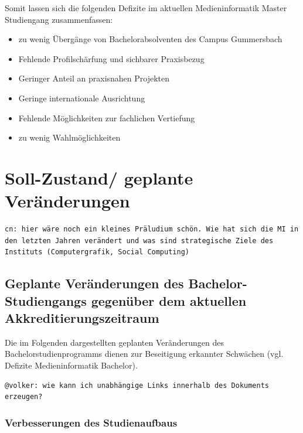 Somit lassen sich die folgenden Defizite im aktuellen Medieninformatik
Master Studiengang zusammenfassen:

\begin{itemize}
\tightlist
\item
  zu wenig Übergänge von Bachelorabsolventen des Campus Gummersbach
\item
  Fehlende Profilschärfung und sichbarer Praxisbezug
\item
  Geringer Anteil an praxisnahen Projekten
\item
  Geringe internationale Ausrichtung
\item
  Fehlende Möglichkeiten zur fachlichen Vertiefung
\item
  zu wenig Wahlmöglichkeiten
\end{itemize}

\chapter{Soll-Zustand/ geplante
Veränderungen}\label{soll-zustand-geplante-veruxe4nderungen}

\begin{verbatim}
cn: hier wäre noch ein kleines Präludium schön. Wie hat sich die MI in den letzten Jahren verändert und was sind strategische Ziele des Instituts (Computergrafik, Social Computing)
\end{verbatim}

\section{Geplante Veränderungen des Bachelor-Studiengangs gegenüber
dem aktuellen
Akkreditierungszeitraum}\label{geplante-veruxe4nderungen-des-bachelor-studiengangs-gegenuxfcber-dem-aktuellen-akkreditierungszeitraum}

Die im Folgenden dargestellten geplanten Veränderungen des
Bachelorstudienprogramms dienen zur Beseitigung erkannter Schwächen
(vgl. Defizite Medieninformatik Bachelor).

\begin{verbatim}
@volker: wie kann ich unabhängige Links innerhalb des Dokuments erzeugen?
\end{verbatim}

\subsection{Verbesserungen des
Studienaufbaus}\label{verbesserungen-des-studienaufbaus}

